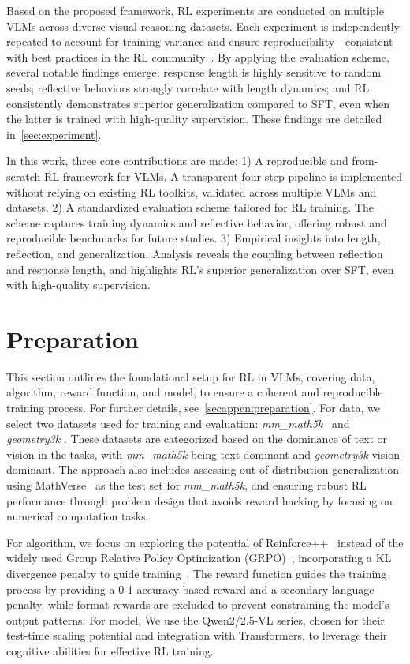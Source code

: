 \documentclass{article} %
\begin{document}
Based on the proposed framework, RL experiments are conducted on multiple VLMs across diverse visual reasoning datasets. Each experiment is independently repeated to account for training variance and ensure reproducibility—consistent with best practices in the RL community~\citep{colas2018many,agarwal2021deep}. By applying the evaluation scheme, several notable findings emerge: response length is highly sensitive to random seeds; reflective behaviors strongly correlate with length dynamics; and RL consistently demonstrates superior generalization compared to SFT, even when the latter is trained with high-quality supervision. These findings are detailed in~\cref{sec:experiment}.

In this work, three core contributions are made: 1) A reproducible and from-scratch RL framework for VLMs.  
A transparent four-step pipeline is implemented without relying on existing RL toolkits, validated across multiple VLMs and datasets.
%
2) A standardized evaluation scheme tailored for RL training.  
The scheme captures training dynamics and reflective behavior, offering robust and reproducible benchmarks for future studies.
%
3) Empirical insights into length, reflection, and generalization.  
Analysis reveals the coupling between reflection and response length, and highlights RL’s superior generalization over SFT, even with high-quality supervision.

\section{Preparation} \label{sec:preparation}

This section outlines the foundational setup for RL in VLMs, covering data, algorithm, reward function, and model, to ensure a coherent and reproducible training process. For further details, see~\cref{secappen:preparation}.
%
For data, we select two datasets used for training and evaluation: \textit{mm\_math5k}~\citep{sun2024mmmath} and \textit{geometry3k} \citep{zheng2025easyr1}. These datasets are categorized based on the dominance of text or vision in the tasks, with \textit{mm\_math5k} being text-dominant and \textit{geometry3k} vision-dominant. The approach also includes assessing out-of-distribution generalization using MathVerse~\citep{zhang2024mathverse} as the test set for \textit{mm\_math5k}, and ensuring robust RL performance through problem design that avoids reward hacking by focusing on numerical computation tasks.

For algorithm, we focus on exploring the potential of Reinforce++~\citep{hu2025reinforce++} instead of the widely used Group Relative Policy Optimization (GRPO)~\citep{shao2024deepseekmath}, incorporating a KL divergence penalty to guide training~\citep{xie2025logicrlunleashingllmreasoning}.
%
The reward function guides the training process by providing a 0-1 accuracy-based reward and a secondary language penalty, while format rewards are excluded to prevent constraining the model’s output patterns.
%
For model,
We use the Qwen2/2.5-VL \citep{wang2024Qwen2-VL, bai2025Qwen2.5-VL} series, chosen for their test-time scaling potential and integration with Transformers, to leverage their cognitive abilities for effective RL training.
\end{document}
